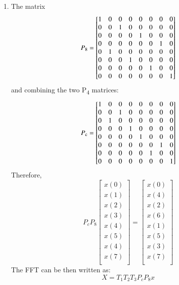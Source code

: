 \documentclass[journal,12pt,twocolumn]{IEEEtran}
\renewcommand\thesection{\arabic{section}}
\begin{document}
\begin{enumerate}[label=\thesection.\arabic*.,ref=\thesection.\theenumi]
\item
The matrix  
\begin{equation}
P\textsubscript{8}  
=
\begin{bmatrix}
1 & 0 & 0 & 0 & 0 & 0 & 0 & 0 \\
0 & 0 & 1 & 0 & 0 & 0 & 0 & 0 \\
0 & 0 & 0 & 0 & 1 & 0 & 0 & 0\\
0 & 0 & 0 & 0 & 0 & 0 & 1 & 0\\
0 & 1 & 0 & 0 & 0 & 0 & 0 & 0 \\
0 & 0 & 0 & 1 & 0 & 0 & 0 & 0 \\
0 & 0 & 0 & 0 & 0 & 1 & 0 & 0 \\
0 & 0 & 0 & 0 & 0 & 0 & 0 & 1
\end{bmatrix}
\end{equation}
and combining the two P\textsubscript{4} matrices:
\begin{equation}
P\textsubscript{c}  
=
\begin{bmatrix}
1 & 0 & 0 & 0 & 0 & 0 & 0 & 0 \\
0 & 0 & 1 & 0 & 0 & 0 & 0 & 0 \\
0 & 1 & 0 & 0 & 0 & 0 & 0 & 0\\
0 & 0 & 0 & 1 & 0 & 0 & 0 & 0\\
0 & 0 & 0 & 0 & 1 & 0 & 0 & 0 \\
0 & 0 & 0 & 0 & 0 & 0 & 1 & 0 \\
0 & 0 & 0 & 0 & 0 & 1 & 0 & 0 \\
0 & 0 & 0 & 0 & 0 & 0 & 0 & 1
\end{bmatrix}
\end{equation}
Therefore,
\begin{equation}
 P_c P_8
\begin{bmatrix}
x(0) \\ 
x(1) \\ 
x(2) \\ 
x(3) \\
x(4) \\ 
x(5) \\ 
x(4) \\ 
x(7) \\
\end{bmatrix}=
\begin{bmatrix}
x(0) \\ 
x(4) \\ 
x(2) \\ 
x(6) \\
x(1) \\ 
x(5) \\ 
x(3) \\ 
x(7) \\
\end{bmatrix}
\end{equation}
The FFT can be then written as:
\begin{equation}
    X = T_1T_2T_3P_cP_8 x
\end{equation}

\end{enumerate}
\end{document}
